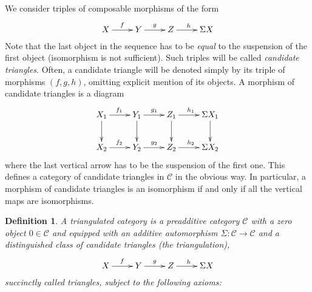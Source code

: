 \documentclass{amsproc}
\newtheorem{defn}[prop]{Definition}
\theoremstyle{definition}
\begin{document}
We consider triples of composable morphisms of the form
\begin{displaymath}
\xymatrix{X\ar[r]^f & Y\ar[r]^g & Z\ar[r]^h & {}\Sigma X}
\end{displaymath}
Note that the last object in the sequence has to be \textit{equal} to the suspension of the first object (isomorphism is not sufficient). Such triples will be called \emph{candidate triangles}. Often, a candidate triangle will be denoted simply by its triple of morphisms $(f,g,h)$, omitting explicit mention of its objects. A morphism of candidate triangles is a diagram
\begin{displaymath}
\xymatrix{X_1\ar[r]^{f_1}\ar[d] & Y_1\ar[r]^{g_1}\ar[d] & Z_1\ar[r]^{h_1}\ar[d] & {}\Sigma X_1\ar[d]\\
X_2\ar[r]^{f_2} & Y_2\ar[r]^{g_2} & Z_2\ar[r]^{h_2} & {}\Sigma X_2}
\end{displaymath}
where the last vertical arrow has to be the suspension of the first one. This defines a category of candidate triangles in ${\mathcal{C}}$ in the obvious way. In particular, a morphism of candidate triangles is an isomorphism if and only if all the vertical maps are isomorphisms.

\begin{defn}
A \emph{triangulated category} is a preadditive category ${\mathcal{C}}$ with a zero object $0\in{\mathcal{C}}$ and equipped with an additive automorphism $\Sigma:{\mathcal{C}}{\longrightarrow}{\mathcal{C}}$ and a distinguished class of candidate triangles (the \emph{triangulation}),
\begin{displaymath}
\xymatrix{X\ar[r]^f & Y\ar[r]^g & Z\ar[r]^h & {}\Sigma X}
\end{displaymath}
succinctly called \emph{triangles}, subject to the following axioms:
\end{defn}
\end{document}
